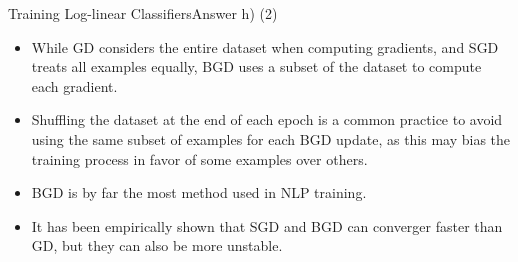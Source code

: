 \documentclass[t]{beamer}
\begin{document}
\begin{frame}{Training Log-linear Classifiers}{Answer h) (2)}
    \begin{itemize}
        \item While GD considers the entire dataset when computing gradients,
              and SGD treats all examples equally, BGD uses a subset of the
              dataset to compute each gradient.
        \item Shuffling the dataset at the end of each epoch is a common
              practice to avoid using the same subset of examples for each BGD
              update, as this may bias the training process in favor of some
              examples over others.
        \item BGD is by far the most method used in NLP training.
        \item It has been empirically shown that SGD and BGD can converger
              faster than GD, but they can also be more unstable.
    \end{itemize}
\end{frame}
\end{document}
